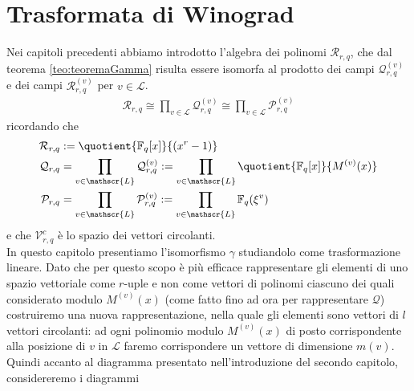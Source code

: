 
\chapter{Trasformata di Winograd} \label{cap:trasformataWinograd}
Nei capitoli precedenti abbiamo introdotto l'algebra dei polinomi $\mathcal{R}_{r,q}$, che dal teorema \ref{teo:teoremaGamma} risulta essere isomorfa al prodotto dei campi $\mathcal{Q}_{r,q}^{(v)}$ e dei campi $\mathcal{R}_{r,q}^{(v)}$ per $v\in \mathscr{L}$.
\begin{align*}
   \mathcal{R}_{r,q}
  \cong
  \prod_{v\in \mathscr{L}} \mathcal{Q}_{r,q}^{(v)}
  \cong
  \prod_{v\in \mathscr{L}} \mathcal{P}_{r,q}^{(v)}
\end{align*}
ricordando che
\begin{align*}
  \mathcal{R}_{r,q}
  &:=
  \quotient{ \mathbb{F}_{q}[x] }{ (x^r -1 )}
\\
  \mathcal{Q}_{r,q}
  &=  \prod_{v \in \mathscr{L}} \mathcal{Q}_{r,q}^{(v)}
  := \prod_{v \in \mathscr{L}} \quotient{ \mathbb{F}_{q}[x] }{ M^{(v)}(x)}
\\
  \mathcal{P}_{r,q}
  &=  \prod_{v \in \mathscr{L}} \mathcal{P}_{r,q}^{(v)}
  := \prod_{v \in \mathscr{L}}  \mathbb{F}_{q}(\xi^{v})
\end{align*}
e che $ \mathcal{V}_{r, q}^{c}$ è lo spazio dei vettori circolanti.\\
In questo capitolo presentiamo l'isomorfismo $\gamma$ studiandolo come trasformazione lineare.
Dato che per questo scopo è più efficace rappresentare gli elementi di uno spazio vettoriale come $r$-uple e non come vettori di polinomi ciascuno dei quali considerato modulo $M^{(v)}(x)$ (come fatto fino ad ora per rappresentare $\mathcal{Q}$) costruiremo una nuova rappresentazione, nella quale gli elementi sono vettori di $l$ vettori circolanti: ad ogni polinomio modulo $M^{(v)}(x)$ di posto corrispondente alla posizione di $v$ in $\mathscr{L}$ faremo corrispondere un vettore di dimensione $m(v)$.\\
Quindi accanto al diagramma presentato nell'introduzione del secondo capitolo, considereremo i diagrammi

